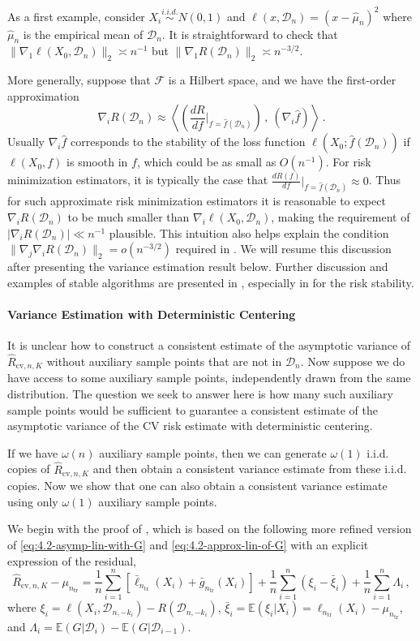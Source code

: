 \documentclass[11pt]{article}
\theoremstyle{plain}
\newcommand{\cv}{{\mathrm{cv}}}
\newcommand{\tr}{{\mathrm{tr}}}
\newcommand{\D}{{\mathcal{D}}}
\begin{document}
As a first example, consider $X_i\stackrel{i.i.d.}{\sim} N(0,1)$ and $\ell(x,\D_n)=(x-\hat\mu_n)^2$ where $\hat\mu_n$ is the empirical mean of $\D_n$.  It is straightforward to check that $\|\nabla_1\ell(X_0,\D_n)\|_2\asymp n^{-1}$ but $\|\nabla_1 R(\D_n)\|_2\asymp n^{-3/2}$.

More generally, suppose that $\mathcal F$ is a Hilbert space, and we have the first-order approximation
$$
\nabla_i R(\D_n) \approx \left\langle\left(\frac{d R}{d f}\bigg|_{f=\hat f(\D_n)}\right)\,,~ \left(\nabla_i \hat f\right)\right\rangle\,.
$$
Usually $\nabla_i\hat f$ corresponds to the stability of the loss function $\ell(X_0;\hat f(\D_n))$ if $\ell(X_0,f)$ is smooth in $f$, which could be as small as $O(n^{-1})$.  For risk minimization estimators, it is typically the case that $\frac{d R(f)}{d f}\big|_{f=\hat f(\D_n)}\approx 0$.  Thus for such approximate risk minimization estimators it is reasonable to expect $\nabla_i R(\D_n)$ to be much smaller than $\nabla_i\ell(X_0,\D_n)$, making the requirement of $|\nabla_i R(\D_n)|\ll n^{-1}$ plausible.   This intuition also helps explain the condition $\|\nabla_j\nabla_i R(\D_n)\|_2=o(n^{-3/2})$ required in .  We will resume this discussion after presenting the variance estimation result below.  Further discussion and examples of stable algorithms are presented in , especially in  for the risk stability.


\paragraph{Variance Estimation with Deterministic Centering}
It is unclear how to construct a consistent estimate of the asymptotic variance of $\hat R_{\cv,n,K}$ without auxiliary sample points that are not in $\D_n$.  Now suppose we do have access to some auxiliary sample points, independently drawn from the same distribution.  The question we seek to answer here is how many such auxiliary sample points would be sufficient to guarantee a consistent estimate of the asymptotic variance of the CV risk estimate with deterministic centering. 

If we have $\omega(n)$ auxiliary sample points, then we can generate $\omega(1)$ i.i.d. copies of $\hat R_{\cv,n,K}$ and then obtain a consistent variance estimate from these i.i.d. copies.  Now we show that one can also obtain a consistent variance estimate using only $\omega(1)$ auxiliary sample points.

We begin with the proof of , which is based on the following  more refined version of \eqref{eq:4.2-asymp-lin-with-G} and \eqref{eq:4.2-approx-lin-of-G} with an explicit expression of the residual,
$$
\hat R_{\cv,n,K} - \mu_{n_\tr} = \frac{1}{n}\sum_{i=1}^n\left[\bar\ell_{n_\tr}(X_i)+\bar g_{n_\tr}(X_i)\right]+ \frac{1}{n}\sum_{i=1}^n(\xi_i-\bar\xi_i)+\frac{1}{n}\sum_{i=1}^n \Lambda_i\,,
$$
where $\xi_i=\ell(X_i,\D_{n,-k_i})-R(\D_{n,-k_i})$, $\bar\xi_i=\mathbb E(\xi_i|X_i)=\ell_{n_\tr}(X_i)-\mu_{n_\tr}$, and $\Lambda_i=\mathbb E(G|\D_i)-\mathbb E(G|\D_{i-1})$.
\end{document}
